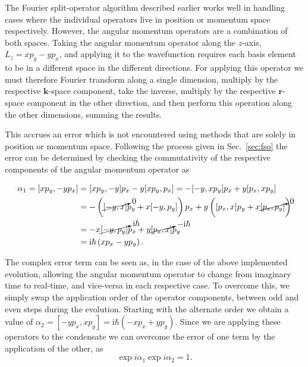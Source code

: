 The Fourier split-operator algorithm described earlier works well in handling cases where the individual operators live in position or momentum space respectively. However, the angular momentum operators are a combination of both spaces. Taking the angular momentum operator along the $z$-axis, $L_z = xp_y - yp_x$, and applying it to the wavefunction requires each basis element to be in a different space in the different directions. For applying this operator we must therefore Fourier transform along a single dimension, multiply by the respective $\mathbf{k}$-space component, take the inverse, multiply by the respective $\mathbf{r}$-space component in the other direction, and then perform this operation along the other dimensions, summing the results.

This accrues an error which is not encountered using methods that are solely in position or momentum space. Following the process given in Sec.~\ref{sec:fso} the error can be determined by checking the commutativity of the respective components of the angular momentum operator as

 \begin{align}
 	\alpha_1 = [x p_y,-y p_x] &= [x p_y,-y] p_x  -  y[x p_y,p_x] = -[-y,x p_y] p_x + y [p_x, x p_y] \nonumber \\
 		&= -\left( {\cancelto{0}{[-y,x]}} p_y + x [-y,p_y] \right) p_x + y \left( [p_x,x] p_y + x {\cancelto{0}{[p_x,p_y]}} \right) \nonumber \\
 		&= -x {\cancelto{\textrm{i}\hbar}{[-y, p_y]}} p_x + y {\cancelto{-\textrm{i}\hbar}{[p_x,x]}} p_y \nonumber \\
        &= \textrm{i}\hbar \left(x p_x - y p_y \right).
 \end{align}

 The complex error term can be seen as, in the case of the above implemented evolution, allowing the angular momentum operator to change from imaginary time to real-time, and vice-versa in each respective case. To overcome this, we simply swap the application order of the operator components, between odd and even steps during the evolution. Starting with the alternate order we obtain a value of $\alpha_2 = [-y p_x, x p_y] = \textrm{i}\hbar \left(-x p_x + y p_y \right)$. Since we are applying these operators to the condensate we can overcome the error of one term by the application of the other, as
 \begin{equation}
 \exp{i \alpha_1}\exp{i \alpha_2} = 1.
 \end{equation}

